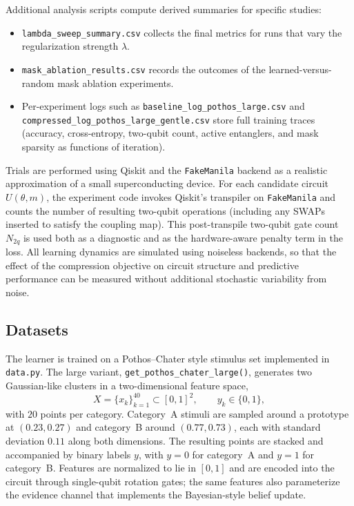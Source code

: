 \documentclass[conference]{IEEEtran}
\begin{document}
Additional analysis scripts compute derived summaries for specific studies:
\begin{itemize}
    \item \texttt{lambda\_sweep\_summary.csv} collects the final metrics for runs that vary the regularization strength $\lambda$.
    \item \texttt{mask\_ablation\_results.csv} records the outcomes of the learned-versus-random mask ablation experiments.
    \item Per-experiment logs such as \texttt{baseline\_log\_pothos\_large.csv} and \texttt{compressed\_log\_pothos\_large\_gentle.csv} store full training traces (accuracy, cross-entropy, two-qubit count, active entanglers, and mask sparsity as functions of iteration).
\end{itemize}

Trials are performed using Qiskit and the \texttt{FakeManila} backend as a realistic approximation of a small superconducting device. For each candidate circuit $U(\theta,m)$, the experiment code invokes Qiskit’s transpiler on \texttt{FakeManila} and counts the number of resulting two-qubit operations (including any SWAPs inserted to satisfy the coupling map). This post-transpile two-qubit gate count $N_{2q}$ is used both as a diagnostic and as the hardware-aware penalty term in the loss. All learning dynamics are simulated using noiseless backends, so that the effect of the compression objective on circuit structure and predictive performance can be measured without additional stochastic variability from noise.

\subsection{Datasets}

The learner is trained on a Pothos--Chater style stimulus set implemented in \texttt{data.py}. The large variant, \texttt{get\_pothos\_chater\_large()}, generates two Gaussian-like clusters in a two-dimensional feature space,
\[
X = \{x_k\}_{k=1}^{40} \subset [0,1]^2,
\qquad
y_k \in \{0,1\},
\]
with $20$ points per category. Category~A stimuli are sampled around a prototype at $(0.23,0.27)$ and category~B around $(0.77,0.73)$, each with standard deviation $0.11$ along both dimensions. The resulting points are stacked and accompanied by binary labels $y$, with $y=0$ for category~A and $y=1$ for category~B. Features are normalized to lie in $[0,1]$ and are encoded into the circuit through single-qubit rotation gates; the same features also parameterize the evidence channel that implements the Bayesian-style belief update.
\end{document}
